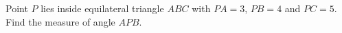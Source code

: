 Point $P$ lies inside equilateral triangle $ABC$ with $PA=3$, $PB=4$ and $PC=5$. Find the measure of angle $APB$.
